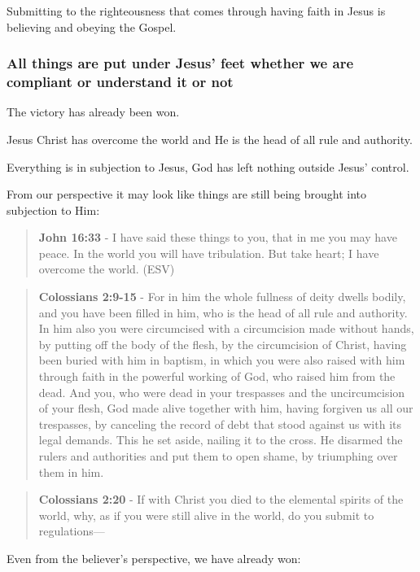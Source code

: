 \documentclass[11pt]{article}
\begin{document}
Submitting to the righteousness that comes through having faith in Jesus is believing and obeying the Gospel.

\subsubsection{All things \textbf{are} put under Jesus' feet whether we are compliant or understand it or not}
\label{sec:orged3c639}
The victory has already been won.

Jesus Christ has overcome the world and He is the head of all rule and authority.

Everything is in subjection to Jesus, God has left nothing outside Jesus' control.

From our perspective it may look like things are still being brought into subjection to Him:

\begin{quote}
\textbf{John 16:33} - I have said these things to you, that in me you may have peace.  In the world you will have tribulation.  But take heart; I have overcome the world.  (ESV)
\end{quote}

\begin{quote}
\textbf{Colossians 2:9-15} - For in him the whole fullness of deity dwells bodily, and you have been filled in him, who is the head of all rule and authority. In him also you were circumcised with a circumcision made without hands, by putting off the body of the flesh, by the circumcision of Christ, having been buried with him in baptism, in which you were also raised with him through faith in the powerful working of God, who raised him from the dead. And you, who were dead in your trespasses and the uncircumcision of your flesh, God made alive together with him, having forgiven us all our trespasses, by canceling the record of debt that stood against us with its legal demands. This he set aside, nailing it to the cross. He disarmed the rulers and authorities and put them to open shame, by triumphing over them in him.
\end{quote}

\begin{quote}
\textbf{Colossians 2:20} - If with Christ you died to the elemental spirits of the world, why, as if you were still alive in the world, do you submit to regulations—
\end{quote}

Even from the believer's perspective, we have already won:
\end{document}
